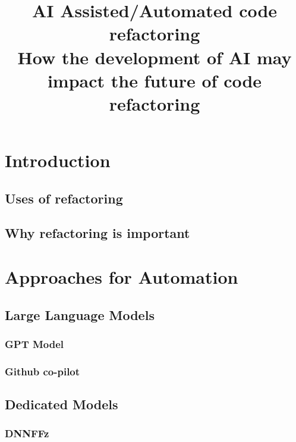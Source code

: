 \documentclass[conference]{IEEEtran}
\begin{document}
\title{AI Assisted/Automated code refactoring\\
{\footnotesize How the development of AI may impact the future of code refactoring}
}

\author{
    \and
}

\maketitle



\section{Introduction}

\subsection{Uses of refactoring}
\subsection{Why refactoring is important}

\section{Approaches for Automation}

\subsection{Large Language Models}
\subsubsection{GPT Model}
\subsubsection{Github co-pilot}
\subsection{Dedicated Models}
\subsubsection{DNNFFz}
\end{document}
